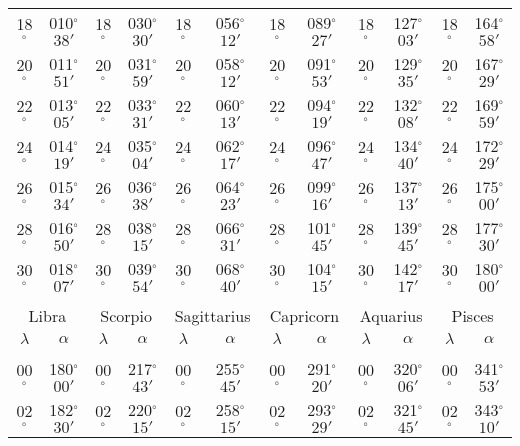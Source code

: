 \begin{table}
{\begin{tabular}{cc|cc|cc|cc|cc|cc}
18$^\circ$ & 010$^\circ$$38'$ & 18$^\circ$ & 030$^\circ$$30'$ & 18$^\circ$ & 056$^\circ$$12'$ & 18$^\circ$ & 089$^\circ$$27'$ & 18$^\circ$ & 127$^\circ$$03'$ & 18$^\circ$ & 164$^\circ$$58'$\\
20$^\circ$ & 011$^\circ$$51'$ & 20$^\circ$ & 031$^\circ$$59'$ & 20$^\circ$ & 058$^\circ$$12'$ & 20$^\circ$ & 091$^\circ$$53'$ & 20$^\circ$ & 129$^\circ$$35'$ & 20$^\circ$ & 167$^\circ$$29'$\\
22$^\circ$ & 013$^\circ$$05'$ & 22$^\circ$ & 033$^\circ$$31'$ & 22$^\circ$ & 060$^\circ$$13'$ & 22$^\circ$ & 094$^\circ$$19'$ & 22$^\circ$ & 132$^\circ$$08'$ & 22$^\circ$ & 169$^\circ$$59'$\\
24$^\circ$ & 014$^\circ$$19'$ & 24$^\circ$ & 035$^\circ$$04'$ & 24$^\circ$ & 062$^\circ$$17'$ & 24$^\circ$ & 096$^\circ$$47'$ & 24$^\circ$ & 134$^\circ$$40'$ & 24$^\circ$ & 172$^\circ$$29'$\\
26$^\circ$ & 015$^\circ$$34'$ & 26$^\circ$ & 036$^\circ$$38'$ & 26$^\circ$ & 064$^\circ$$23'$ & 26$^\circ$ & 099$^\circ$$16'$ & 26$^\circ$ & 137$^\circ$$13'$ & 26$^\circ$ & 175$^\circ$$00'$\\
28$^\circ$ & 016$^\circ$$50'$ & 28$^\circ$ & 038$^\circ$$15'$ & 28$^\circ$ & 066$^\circ$$31'$ & 28$^\circ$ & 101$^\circ$$45'$ & 28$^\circ$ & 139$^\circ$$45'$ & 28$^\circ$ & 177$^\circ$$30'$\\
30$^\circ$ & 018$^\circ$$07'$ & 30$^\circ$ & 039$^\circ$$54'$ & 30$^\circ$ & 068$^\circ$$40'$ & 30$^\circ$ & 104$^\circ$$15'$ & 30$^\circ$ & 142$^\circ$$17'$ & 30$^\circ$ & 180$^\circ$$00'$\\
\multicolumn{12}{c}{}\\
\multicolumn{2}{c}{Libra}\vline & \multicolumn{2}{c}{Scorpio} \vline& \multicolumn{2}{c}{Sagittarius} \vline& \multicolumn{2}{c}{Capricorn}\vline &
\multicolumn{2}{c}{Aquarius}\vline & \multicolumn{2}{c}{Pisces}\\\hline
$\lambda$& $\alpha$& $\lambda$& $\alpha$& $\lambda$& $\alpha$& $\lambda$& $\alpha$& $\lambda$& $\alpha$& $\lambda$& $\alpha$\\\hline
&&&&&&&&&&&\\[-2ex]
00$^\circ$ & 180$^\circ$$00'$ & 00$^\circ$ & 217$^\circ$$43'$ & 00$^\circ$ & 255$^\circ$$45'$ & 00$^\circ$ & 291$^\circ$$20'$ &  00$^\circ$ & 320$^\circ$$06'$ & 00$^\circ$ & 341$^\circ$$53'$\\
02$^\circ$ & 182$^\circ$$30'$ & 02$^\circ$ & 220$^\circ$$15'$ & 02$^\circ$ & 258$^\circ$$15'$ & 02$^\circ$ & 293$^\circ$$29'$ &  02$^\circ$ & 321$^\circ$$45'$ & 02$^\circ$ & 343$^\circ$$10'$\\

\end{tabular}}
\end{table}
